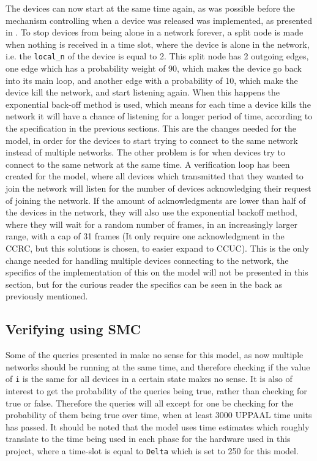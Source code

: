 The devices can now start at the same time again, as was possible before the mechanism controlling when a device was released was implemented, as presented in .
To stop devices from being alone in a network forever, a split node is made when nothing is received in a time slot, where the device is alone in the network, i.e. the \texttt{local\_n} of the device is equal to 2.
This split node has 2 outgoing edges, one edge which has a probability weight of 90, which makes the device go back into its main loop, and another edge with a probability of 10, which make the device kill the network, and start listening again.
When this happens the exponential back-off method is used, which means for each time a device kills the network it will have a chance of listening for a longer period of time, according to the specification in the previous sections.
This are the changes needed for the model, in order for the devices to start trying to connect to the same network instead of multiple networks.
The other problem is for when devices try to connect to the same network at the same time.
A verification loop has been created for the model, where all devices which transmitted that they wanted to join the network will listen for the number of devices acknowledging their request of joining the network.
If the amount of acknowledgments are lower than half of the devices in the network, they will also use the exponential backoff method, where they will wait for a random number of frames, in an increasingly larger range, with a cap of 31 frames (It only require one acknowledgment in the CCRC, but this solutions is chosen, to easier expand to CCUC).
This is the only change needed for handling multiple devices connecting to the network, the specifics of the implementation of this on the model will not be presented in this section, but for the curious reader the specifics can be seen in the back as previously mentioned. 


\subsection*{Verifying using SMC}

Some of the queries presented in  make no sense for this model, as now multiple networks should be running at the same time, and therefore checking if the value of \texttt{i} is the same for all devices in a certain state makes no sense.
It is also of interest to get the probability of the queries being true, rather than checking for true or false.
Therefore the queries will all except for one be checking for the probability of them being true over time, when at least 3000 UPPAAL time units has passed.
It should be noted that the model uses time estimates which roughly translate to the time being used in each phase for the hardware used in this project, where a time-slot is equal to \texttt{Delta} which is set to 250 for this model.

